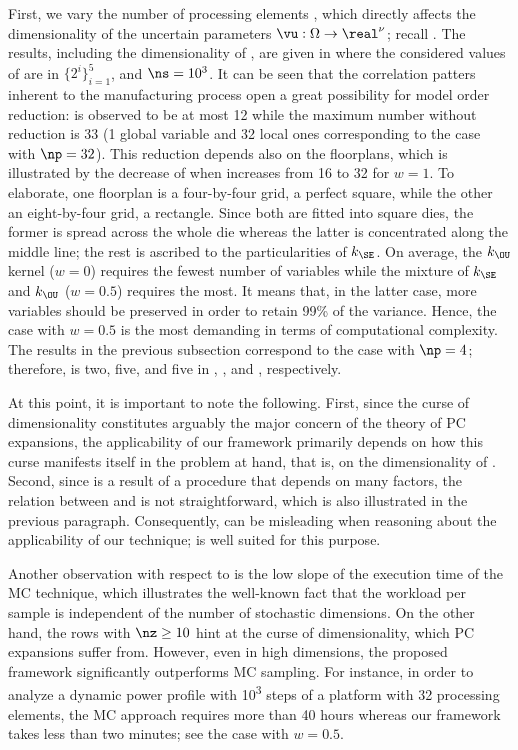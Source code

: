 First, we vary the number of processing elements \np, which directly affects the
dimensionality of the uncertain parameters $\vu: \Omega \to \real^\nu$; recall
. The results, including the dimensionality
\nz of \vz, are given in  where the considered
values of \np are in $\{ 2^i \}_{i = 1}^5$, and $\ns = 10^3$. It can be seen
that the correlation patters inherent to the manufacturing process
\cite{cheng2011} open a great possibility for model order reduction: \nz is
observed to be at most 12 while the maximum number without reduction is 33 (1
global variable and 32 local ones corresponding to the case with $\np = 32$).
This reduction depends also on the floorplans, which is illustrated by the
decrease of \nz when \np increases from 16 to 32 for $w = 1$. To elaborate, one
floorplan is a four-by-four grid, a perfect square, while the other an
eight-by-four grid, a rectangle. Since both are fitted into square dies, the
former is spread across the whole die whereas the latter is concentrated along
the middle line; the rest is ascribed to the particularities of $k_\SE$. On
average, the $k_\OU$ kernel ($w = 0$) requires the fewest number of variables
while the mixture of $k_\SE$ and $k_\OU$ ($w = 0.5$) requires the most. It means
that, in the latter case, more variables should be preserved in order to retain
99\% of the variance. Hence, the case with $w = 0.5$ is the most demanding in
terms of computational complexity. The results in the previous subsection
correspond to the case with $\np = 4$; therefore, \nz is two, five, and five in
, , and ,
respectively.

At this point, it is important to note the following. First, since the curse of
dimensionality constitutes arguably the major concern of the theory of \ac{PC}
expansions, the applicability of our framework primarily depends on how this
curse manifests itself in the problem at hand, that is, on the dimensionality
\nz of \vz. Second, since \vz is a result of a procedure that depends on many
factors, the relation between \vu and \vz is not straightforward, which is also
illustrated in the previous paragraph. Consequently, \nu can be misleading when
reasoning about the applicability of our technique; \nz is well suited for this
purpose.

Another observation with respect to  is the low
slope of the execution time of the \ac{MC} technique, which illustrates the
well-known fact that the workload per sample is independent of the number of
stochastic dimensions. On the other hand, the rows with $\nz \geq 10$ hint at
the curse of dimensionality, which \ac{PC} expansions suffer from. However, even
in high dimensions, the proposed framework significantly outperforms \ac{MC}
sampling. For instance, in order to analyze a dynamic power profile with
10\textsuperscript{3} steps of a platform with 32 processing elements, the
\ac{MC} approach requires more than 40 hours whereas our framework takes less
than two minutes; see the case with $w = 0.5$.

